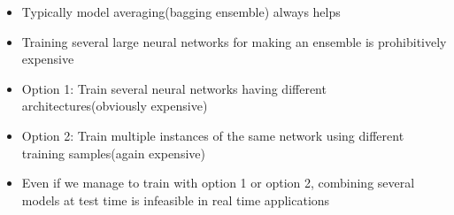 \begin{frame}
\begin{columns}
{\begin{minipage}{0.31\textwidth}
		\end{minipage}}
		\begin{overlayarea}{\textwidth}{\textheight}
			\begin{itemize}
				\justifying
				\item<1->  Typically model averaging(bagging ensemble) always helps
				\item <2-> Training several large neural networks for making an ensemble is prohibitively expensive
				\item<3->  Option 1: Train several neural networks having different architectures(obviously expensive)
				\item<4->  Option 2: Train multiple instances of the same network using different training samples(again expensive)
				\item<5->  Even if we manage to train with option 1 or option 2, combining several models at test time is infeasible in real time applications
			\end{itemize}
		\end{overlayarea}
	\end{columns}
\end{frame}
				
